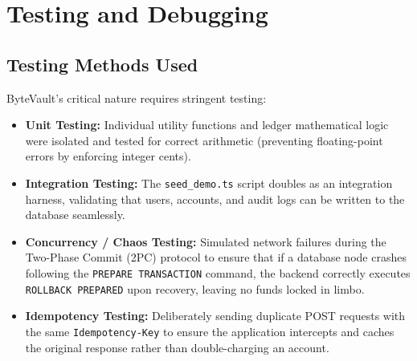 \chapter{Testing and Debugging}

\section{Testing Methods Used}
ByteVault's critical nature requires stringent testing:
\begin{itemize}
    \item \textbf{Unit Testing:} Individual utility functions and ledger mathematical logic were isolated and tested for correct arithmetic (preventing floating-point errors by enforcing integer cents).
    \item \textbf{Integration Testing:} The \texttt{seed\_demo.ts} script doubles as an integration harness, validating that users, accounts, and audit logs can be written to the database seamlessly.
    \item \textbf{Concurrency / Chaos Testing:} Simulated network failures during the Two-Phase Commit (2PC) protocol to ensure that if a database node crashes following the \texttt{PREPARE TRANSACTION} command, the backend correctly executes \texttt{ROLLBACK PREPARED} upon recovery, leaving no funds locked in limbo.
    \item \textbf{Idempotency Testing:} Deliberately sending duplicate POST requests with the same \texttt{Idempotency-Key} to ensure the application intercepts and caches the original response rather than double-charging an account.
\end{itemize}

